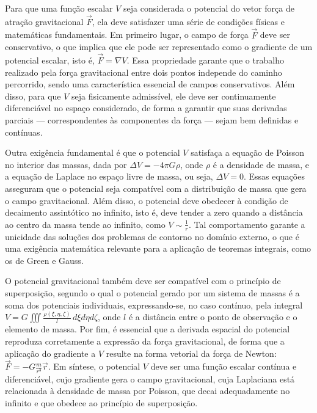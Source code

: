 Para que uma função escalar \( V \) seja considerada o potencial do vetor força de atração gravitacional \( \vec{F} \), ela deve satisfazer uma série de condições físicas e matemáticas fundamentais. Em primeiro lugar, o campo de força \( \vec{F} \) deve ser conservativo, o que implica que ele pode ser representado como o gradiente de um potencial escalar, isto é, \( \vec{F} = \nabla V \). Essa propriedade garante que o trabalho realizado pela força gravitacional entre dois pontos independe do caminho percorrido, sendo uma característica essencial de campos conservativos. Além disso, para que \( V \) seja fisicamente admissível, ele deve ser continuamente diferenciável no espaço considerado, de forma a garantir que suas derivadas parciais — correspondentes às componentes da força — sejam bem definidas e contínuas.

Outra exigência fundamental é que o potencial \( V \) satisfaça a equação de Poisson no interior das massas, dada por \( \Delta V = -4\pi G \rho \), onde \( \rho \) é a densidade de massa, e a equação de Laplace no espaço livre de massa, ou seja, \( \Delta V = 0 \). Essas equações asseguram que o potencial seja compatível com a distribuição de massa que gera o campo gravitacional. Além disso, o potencial deve obedecer à condição de decaimento assintótico no infinito, isto é, deve tender a zero quando a distância ao centro da massa tende ao infinito, como \( V \sim \frac{1}{r} \). Tal comportamento garante a unicidade das soluções dos problemas de contorno no domínio externo, o que é uma exigência matemática relevante para a aplicação de teoremas integrais, como os de Green e Gauss.

O potencial gravitacional também deve ser compatível com o princípio de superposição, segundo o qual o potencial gerado por um sistema de massas é a soma dos potenciais individuais, expressando-se, no caso contínuo, pela integral \( V = G \iiint \frac{\rho(\xi, \eta, \zeta)}{l} \, d\xi d\eta d\zeta \), onde \( l \) é a distância entre o ponto de observação e o elemento de massa. Por fim, é essencial que a derivada espacial do potencial reproduza corretamente a expressão da força gravitacional, de forma que a aplicação do gradiente a \( V \) resulte na forma vetorial da força de Newton: \( \vec{F} = -G \frac{m}{r^3} \vec{r} \). Em síntese, o potencial \( V \) deve ser uma função escalar contínua e diferenciável, cujo gradiente gera o campo gravitacional, cuja Laplaciana está relacionada à densidade de massa por Poisson, que decai adequadamente no infinito e que obedece ao princípio de superposição.